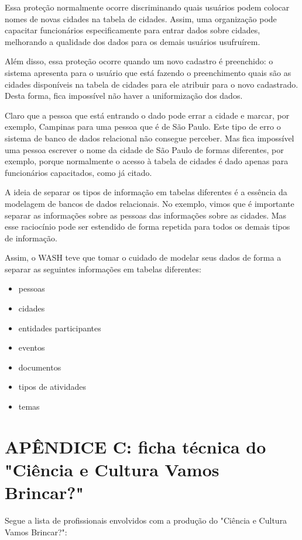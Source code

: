 Essa proteção normalmente ocorre discriminando quais usuários podem colocar nomes de novas cidades na tabela de cidades. Assim, uma organização pode capacitar funcionários especificamente para entrar dados sobre cidades, melhorando a qualidade dos dados para os demais usuários usufruírem.

Além disso, essa proteção ocorre quando um novo cadastro é preenchido: o sistema apresenta para o usuário que está fazendo o preenchimento quais são as cidades disponíveis na tabela de cidades para ele atribuir para o novo cadastrado. Desta forma, fica impossível não haver a uniformização dos dados.

Claro que a pessoa que está entrando o dado pode errar a cidade e marcar, por exemplo, Campinas para uma pessoa que é de São Paulo. Este tipo de erro o sistema de banco de dados relacional não consegue perceber. Mas fica impossível uma pessoa escrever o nome da cidade de São Paulo de formas diferentes, por exemplo, porque normalmente o acesso à tabela de cidades é dado apenas para funcionários capacitados, como já citado.

A ideia de separar os tipos de informação em tabelas diferentes é a essência da modelagem de bancos de dados relacionais. No exemplo, vimos que é importante separar as informações sobre as pessoas das informações sobre as cidades. Mas esse raciocínio pode ser estendido de forma repetida para todos os demais tipos de informação.

Assim, o WASH teve que tomar o cuidado de modelar seus dados de forma a separar as seguintes informações em tabelas diferentes:


\begin{itemize}
\item pessoas
\item cidades
\item entidades participantes
\item eventos
\item documentos
\item tipos de atividades
\item temas
\end{itemize}

\chapter[APÊNDICE C: ficha técnica do "Ciência e Cultura Vamos Brincar?"]{APÊNDICE C: ficha técnica do "Ciência e Cultura Vamos Brincar?"}\label{APÊNDICE C: ficha técnica do "Ciência e Cultura Vamos Brincar?"}
Segue a lista de profissionais envolvidos com a produção do "Ciência e Cultura Vamos Brincar?":


